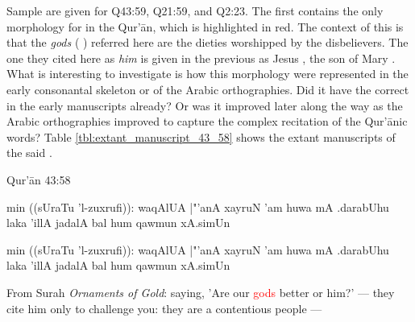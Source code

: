 Sample   are given for Q43:59, Q21:59, and Q2:23. The first   contains the only morphology for   in the Qur'\=an, which is highlighted in red. The context of this   is that the \textit{gods} ( ) referred here are the dieties worshipped by the disbelievers. The one they cited here as \textit{him} is given in the previous    as Jesus , the son of Mary . What is interesting to investigate is how this morphology were represented in the early consonantal skeleton or   of the Arabic orthographies. Did it have the correct   in the early manuscripts already? Or was it improved later along the way as the Arabic orthographies improved to capture the complex recitation of the Qur'\=anic words? Table \ref{tbl:extant_manuscript_43_58} shows the extant manuscripts of the said  .

\begin{bottomtitledframe}{Qur'\=an 43:58}
    \begin{center}
        \begin{arab}[fullvoc]
            min ((sUraTu 'l-zuxrufi)): waqAlUA |"'anA xayruN 'am huwa mA .darabUhu laka 'illA jadalA bal hum qawmun xA.simUn
        \end{arab}
        \begin{arab}[trans]
            min ((sUraTu 'l-zuxrufi)): waqAlUA |"'anA xayruN 'am huwa mA .darabUhu laka 'illA jadalA bal hum qawmun xA.simUn
        \end{arab}
    \end{center}
    From Surah \textit{Ornaments of Gold}: saying, 'Are our \textcolor{red}{gods} better or him?' --- they cite him only to challenge you: they are a contentious people ---
\end{bottomtitledframe}


